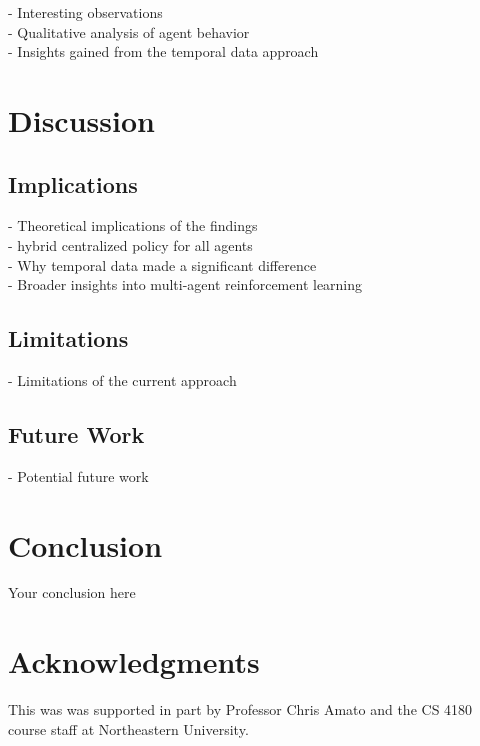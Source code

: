 \documentclass{article}
\begin{document}
- Interesting observations\\
- Qualitative analysis of agent behavior\\
- Insights gained from the temporal data approach

\section{Discussion}

\subsection{Implications}
- Theoretical implications of the findings\\
  - hybrid centralized policy for all agents\\
- Why temporal data made a significant difference\\
- Broader insights into multi-agent reinforcement learning

\subsection{Limitations}
- Limitations of the current approach

\subsection{Future Work}
- Potential future work



\section{Conclusion}
Your conclusion here

\section*{Acknowledgments}
This was was supported in part by Professor Chris Amato and the CS 4180 course staff at Northeastern University.


  
  
\end{document}
